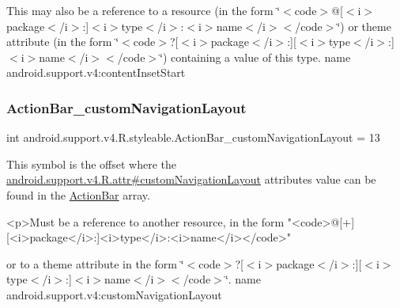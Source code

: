 This may also be a reference to a resource (in the form \char`\"{}$<$code$>$@\mbox{[}$<$i$>$package$<$/i$>$\+:\mbox{]}$<$i$>$type$<$/i$>$\+:$<$i$>$name$<$/i$>$$<$/code$>$\char`\"{}) or theme attribute (in the form \char`\"{}$<$code$>$?\mbox{[}$<$i$>$package$<$/i$>$\+:\mbox{]}\mbox{[}$<$i$>$type$<$/i$>$\+:\mbox{]}$<$i$>$name$<$/i$>$$<$/code$>$\char`\"{}) containing a value of this type.  name android.\+support.\+v4\+:content\+Inset\+Start \mbox{\label{classandroid_1_1support_1_1v4_1_1R_1_1styleable_a1ea53c5c11ad0d5f6a9a592da14f2b64}} 
\subsubsection{\texorpdfstring{Action\+Bar\+\_\+custom\+Navigation\+Layout}{ActionBar\_customNavigationLayout}}
{\footnotesize\ttfamily int android.\+support.\+v4.\+R.\+styleable.\+Action\+Bar\+\_\+custom\+Navigation\+Layout = 13\hspace{0.3cm}{\ttfamily [static]}}

This symbol is the offset where the \hyperlink{classandroid_1_1support_1_1v4_1_1R_1_1attr_a79b992d45ea08400e2b705f6352e89f2}{android.\+support.\+v4.\+R.\+attr\#custom\+Navigation\+Layout} attribute\textquotesingle{}s value can be found in the \hyperlink{classandroid_1_1support_1_1v4_1_1R_1_1styleable_adc5a3492b9c46265760d7120a04d6afa}{Action\+Bar} array.

\begin{DoxyVerb}      <p>Must be a reference to another resource, in the form "<code>@[+][<i>package</i>:]<i>type</i>:<i>name</i></code>"
\end{DoxyVerb}
 or to a theme attribute in the form \char`\"{}$<$code$>$?\mbox{[}$<$i$>$package$<$/i$>$\+:\mbox{]}\mbox{[}$<$i$>$type$<$/i$>$\+:\mbox{]}$<$i$>$name$<$/i$>$$<$/code$>$\char`\"{}.  name android.\+support.\+v4\+:custom\+Navigation\+Layout \mbox{\label{classandroid_1_1support_1_1v4_1_1R_1_1styleable_a777891bdb003968579bc757b1781ca24}} 
